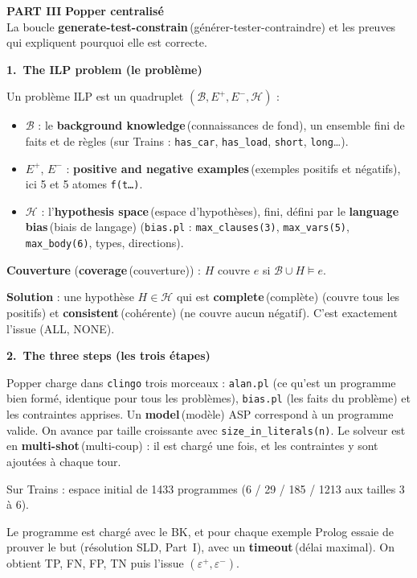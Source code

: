\documentclass[10pt]{article}
\newcommand{\EN}[2]{\textbf{#1}\,{\scriptsize\textcolor{marine}{(#2)}}}
\newcommand{\titrebox}[2]{\needspace{10\baselineskip}\vspace{8pt}
  \begin{tcolorbox}[colback=marine, colframe=marine, arc=0pt, boxrule=0pt,
    top=4pt, bottom=4pt, left=8pt]
  \color{white}\Large\bfseries #1.~#2
  \end{tcolorbox}\vspace{2pt}}
\newcommand{\st}[1]{\par\needspace{7\baselineskip}\vspace{5pt}{\normalsize\bfseries\textcolor{marine}{#1}}\par\vspace{2pt}}
\newcommand{\partie}[3]{\newpage
  \begin{tcolorbox}[colback=pastel, colframe=pastel, arc=0pt, boxrule=0pt,
    top=8pt, bottom=8pt, left=10pt]
  {\fontsize{26}{28}\selectfont\bfseries\textcolor{marine}{PART #1}}\quad
  {\Large\bfseries\textcolor{encre}{#2}}\\[2pt]{\small #3}
  \end{tcolorbox}\vspace{4pt}}
\begin{document}
\partie{III}{Popper centralisé}{La boucle \EN{generate-test-constrain}{générer-tester-contraindre} et les preuves qui expliquent pourquoi elle est correcte.}

\titrebox{1}{The ILP problem (le problème)}
Un problème ILP est un quadruplet $(\mathcal{B},E^+,E^-,\mathcal{H})$ :
\begin{itemize}
  \item $\mathcal{B}$ : le \EN{background knowledge}{connaissances de fond}, un ensemble fini de faits et de règles (sur Trains : \texttt{has\_car}, \texttt{has\_load}, \texttt{short}, \texttt{long}\ldots).
  \item $E^+$, $E^-$ : \EN{positive and negative examples}{exemples positifs et négatifs}, ici 5 et 5 atomes \texttt{f(t\ldots)}.
  \item $\mathcal{H}$ : l'\EN{hypothesis space}{espace d'hypothèses}, fini, défini par le \EN{language bias}{biais de langage}
        (\texttt{bias.pl} : \texttt{max\_clauses(3)}, \texttt{max\_vars(5)}, \texttt{max\_body(6)}, types, directions).
\end{itemize}
\textbf{Couverture} (\EN{coverage}{couverture}) : $H$ couvre $e$ si $\mathcal{B}\cup H\models e$.\par\vspace{2pt}
\textbf{Solution} : une hypothèse $H\in\mathcal{H}$ qui est \EN{complete}{complète} (couvre tous les positifs) et \EN{consistent}{cohérente} (ne couvre aucun négatif).
C'est exactement l'issue (ALL, NONE).

\titrebox{2}{The three steps (les trois étapes)}

\st{Generate : le générateur ASP}
Popper charge dans \texttt{clingo} trois morceaux : \texttt{alan.pl} (ce qu'est un programme bien formé, identique pour tous les problèmes),
\texttt{bias.pl} (les faits du problème) et les contraintes apprises. Un \EN{model}{modèle} ASP correspond à un programme valide.
On avance par taille croissante avec \texttt{size\_in\_literals(n)}. Le solveur est en \EN{multi-shot}{multi-coup} : il est chargé une fois, et les contraintes y sont ajoutées à chaque tour.\par\vspace{2pt}
Sur Trains : espace initial de 1433 programmes (6 / 29 / 185 / 1213 aux tailles 3 à 6).

\st{Test : Prolog}
Le programme est chargé avec le BK, et pour chaque exemple Prolog essaie de prouver le but (résolution SLD, Part~I), avec un \EN{timeout}{délai maximal}.
On obtient TP, FN, FP, TN puis l'issue $(\varepsilon^+,\varepsilon^-)$.
\end{document}
